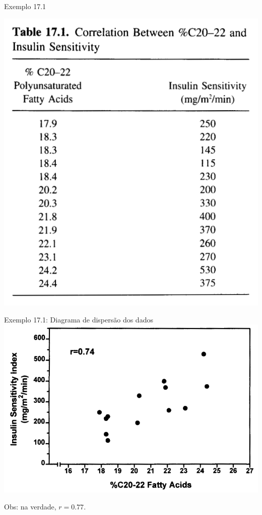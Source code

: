 \documentclass{beamer}
\begin{document}
\begin{frame}{\scriptsize Exemplo 17.1}
  \begin{center}
      \includegraphics[height=0.8\textheight]{Cap17/table}
  \end{center}
\end{frame}

\begin{frame}{\scriptsize Exemplo 17.1: Diagrama de dispersão dos dados}
  \includegraphics[width=\textwidth]{Cap17/scatter}

  Obs: na verdade, $r=0.77$.
\end{frame}
\end{document}
